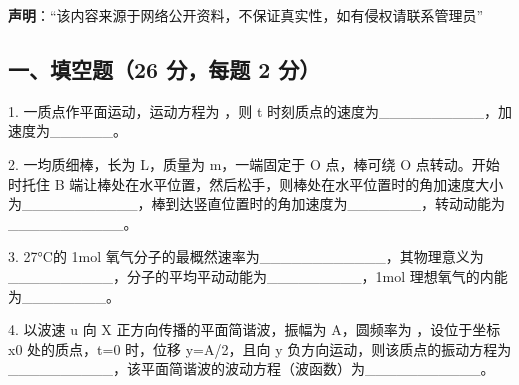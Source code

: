 
\textbf{声明}：“该内容来源于网络公开资料，不保证真实性，如有侵权请联系管理员”

\subsection{一、填空题（26 分，每题 2 分）}
1. 一质点作平面运动，运动方程为 ，则 t 时刻质点的速度为__________，加速度为______。

2. 一均质细棒，长为 L，质量为 m，一端固定于 O 点，棒可绕 O 点转动。开始时托住 B 端让棒处在水平位置，然后松手，则棒处在水平位置时的角加速度大小为___________，棒到达竖直位置时的角加速度为_______，转动动能为___________。

3. 27°C的 1mol 氧气分子的最概然速率为____________，其物理意义为__________，分子的平均平动动能为_________，1mol 理想氧气的内能为________。

4. 以波速 u 向 X 正方向传播的平面简谐波，振幅为 A，圆频率为 ，设位于坐标 x0 处的质点，t=0 时，位移 y=A/2，且向 y 负方向运动，则该质点的振动方程为__________，该平面简谐波的波动方程（波函数）为___________。